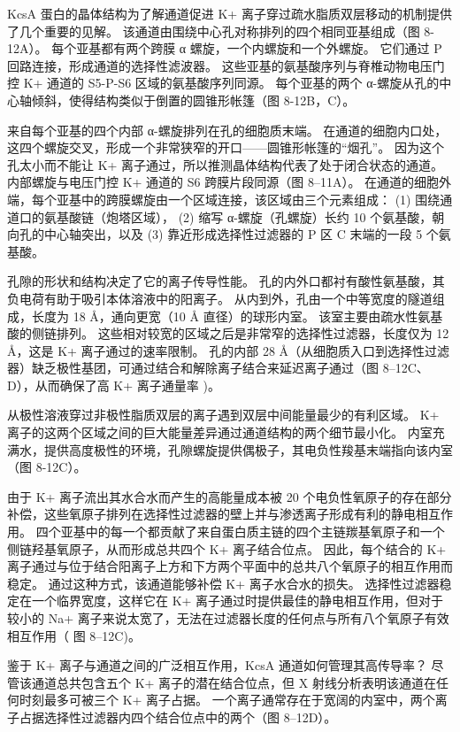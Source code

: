 KcsA 蛋白的晶体结构为了解通道促进 K+ 离子穿过疏水脂质双层移动的机制提供了几个重要的见解。 
该通道由围绕中心孔对称排列的四个相同亚基组成（图 8-12A）。 
每个亚基都有两个跨膜 α 螺旋，一个内螺旋和一个外螺旋。 
它们通过 P 回路连接，形成通道的选择性滤波器。 
这些亚基的氨基酸序列与脊椎动物电压门控 K+ 通道的 S5-P-S6 区域的氨基酸序列同源。 
每个亚基的两个 α-螺旋从孔的中心轴倾斜，使得结构类似于倒置的圆锥形帐篷（图 8-12B，C）。


来自每个亚基的四个内部 α-螺旋排列在孔的细胞质末端。 
在通道的细胞内口处，这四个螺旋交叉，形成一个非常狭窄的开口——圆锥形帐篷的“烟孔”。 
因为这个孔太小而不能让 K+ 离子通过，所以推测晶体结构代表了处于闭合状态的通道。 
内部螺旋与电压门控 K+ 通道的 S6 跨膜片段同源（图 8–11A）。 
在通道的细胞外端，每个亚基中的跨膜螺旋由一个区域连接，该区域由三个元素组成：
(1) 围绕通道口的氨基酸链（炮塔区域），
(2) 缩写 α-螺旋（孔螺旋）长约 10 个氨基酸，朝向孔的中心轴突出，以及
(3) 靠近形成选择性过滤器的 P 区 C 末端的一段 5 个氨基酸。


孔隙的形状和结构决定了它的离子传导性能。 
孔的内外口都衬有酸性氨基酸，其负电荷有助于吸引本体溶液中的阳离子。 
从内到外，孔由一个中等宽度的隧道组成，长度为 18 Å，通向更宽（10 Å 直径）的球形内室。 
该室主要由疏水性氨基酸的侧链排列。 
这些相对较宽的区域之后是非常窄的选择性过滤器，长度仅为 12 Å，这是 K+ 离子通过的速率限制。 
孔的内部 28 Å（从细胞质入口到选择性过滤器）缺乏极性基团，可通过结合和解除离子结合来延迟离子通过（图 8–12C、D），从而确保了高 K+ 离子通量率 )。


从极性溶液穿过非极性脂质双层的离子遇到双层中间能量最少的有利区域。 
K+ 离子的这两个区域之间的巨大能量差异通过通道结构的两个细节最小化。 
内室充满水，提供高度极性的环境，孔隙螺旋提供偶极子，其电负性羧基末端指向该内室（图 8-12C）。


由于 K+ 离子流出其水合水而产生的高能量成本被 20 个电负性氧原子的存在部分补偿，这些氧原子排列在选择性过滤器的壁上并与渗透离子形成有利的静电相互作用。 
四个亚基中的每一个都贡献了来自蛋白质主链的四个主链羰基氧原子和一个侧链羟基氧原子，从而形成总共四个 K+ 离子结合位点。 
因此，每个结合的 K+ 离子通过与位于结合阳离子上方和下方两个平面中的总共八个氧原子的相互作用而稳定。 
通过这种方式，该通道能够补偿 K+ 离子水合水的损失。 
选择性过滤器稳定在一个临界宽度，这样它在 K+ 离子通过时提供最佳的静电相互作用，但对于较小的 Na+ 离子来说太宽了，无法在过滤器长度的任何点与所有八个氧原子有效相互作用（ 图 8–12C)。


鉴于 K+ 离子与通道之间的广泛相互作用，KcsA 通道如何管理其高传导率？ 
尽管该通道总共包含五个 K+ 离子的潜在结合位点，但 X 射线分析表明该通道在任何时刻最多可被三个 K+ 离子占据。 
一个离子通常存在于宽阔的内室中，两个离子占据选择性过滤器内四个结合位点中的两个（图 8–12D）。


